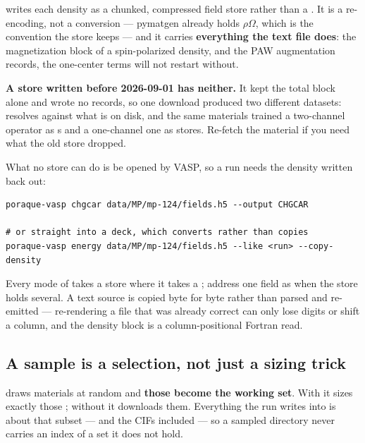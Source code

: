  writes each density as a chunked, compressed field store rather
than a . It is a re-encoding, not a conversion --- pymatgen
already holds $\rho\Omega$, which is the convention the store keeps --- and it
carries \textbf{everything the text file does}: the magnetization block of a
spin-polarized density, and the PAW augmentation records, the one-center terms
 will not restart without.

\begin{pwarn}
\textbf{A store written before 2026-09-01 has neither.} It kept the total block
alone and wrote no records, so one download produced two different datasets:
 resolves against what is on disk, and the same materials
trained a two-channel operator as s and a one-channel one as
stores. Re-fetch the material if you need what the old store dropped.
\end{pwarn}

What no store can do is be opened by VASP, so a run needs the density written
back out:

\begin{lstlisting}
poraque-vasp chgcar data/MP/mp-124/fields.h5 --output CHGCAR

# or straight into a deck, which converts rather than copies
poraque-vasp energy data/MP/mp-124/fields.h5 --like <run> --copy-density
\end{lstlisting}

Every mode of  takes a store where it takes a ;
address one field as  when the store holds several. A
text source is copied byte for byte rather than parsed and re-emitted ---
re-rendering a file that was already correct can only lose digits or shift a
column, and the density block is a column-positional Fortran read.

\subsection*{A sample is a selection, not just a sizing trick}

 draws  materials at random and \textbf{those become the
working set}. With  it sizes exactly those ; without
 it downloads them. Everything the run writes into
 is about that subset ---  and the CIFs
included --- so a sampled directory never carries an index of a set it does not
hold.


